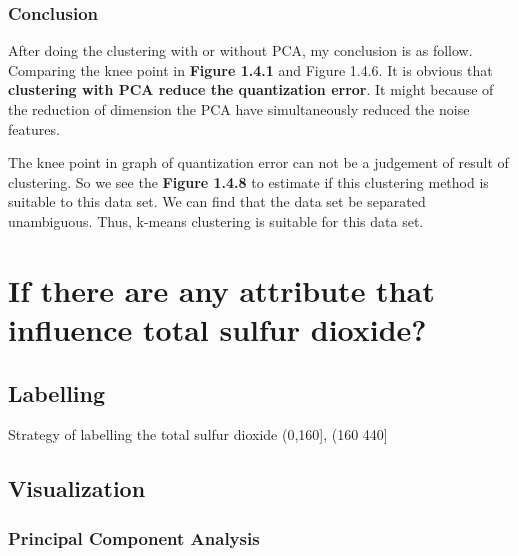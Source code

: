 \documentclass[titlepage,a4paper,12pt,thmsb]{report}
\begin{document}
{\begin{center}
\begin{figure}[h]
{\par}
\end{figure}
{}
\end{center}


\newpage

\subsection{Conclusion}

After  doing the clustering with or without PCA, my conclusion is as follow. Comparing the knee point in {\bf Figure 1.4.1} and {Figure 1.4.6}. It is obvious that {\bf clustering with PCA reduce the quantization error}. It might because of the reduction of dimension the PCA have simultaneously reduced the noise features.

The knee point in graph of quantization error can not be a judgement of result of clustering. So we see the {\bf Figure 1.4.8} to estimate if this clustering method is suitable to this data set. We can find that the data set be separated unambiguous. Thus, k-means clustering is suitable for this data set.


\newpage




\chapter{If there are any attribute that influence total sulfur dioxide?}

\section{Labelling}

Strategy of labelling the total sulfur dioxide (0,160], (160 440]

\section{Visualization}

\subsection{Principal Component Analysis}

}
\end{document}
